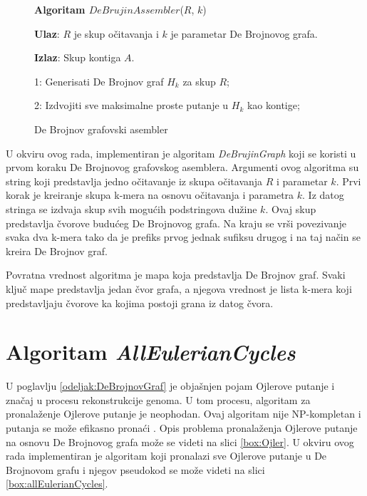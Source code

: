 \documentclass[12pt,oneside]{memoir}
\begin{document}
\begin{comment}

\begin{figure}[!ht]
\centering
\texttt{[image: Figura5\_17.PNG]}
\caption{Jednostavan De Brojnov grafovski asembler \cite{WingKinSung}}
\label{fig:11}
\end{figure}

\end{comment}

\begin{figure}[!ht]
\begin{tcolorbox}
\textbf{Algoritam $DeBrujinAssembler$}($R$, $k$)

\textbf{Ulaz}: $R$ je skup očitavanja i $k$ je parametar De Brojnovog grafa.

\textbf{Izlaz}: Skup kontiga $A$.

1: Generisati De Brojnov graf $H_k$ za skup $R$;

2: Izdvojiti sve maksimalne proste putanje u $H_k$ kao kontige;

\end{tcolorbox}
\caption{De Brojnov grafovski asembler \cite{WingKinSung}}
\label{box:DeBrujinAssembler}
\end{figure}

U okviru ovog rada, implementiran je algoritam \textit{DeBrujinGraph} koji se koristi u prvom koraku De Brojnovog grafovskog asemblera. Argumenti ovog algoritma su string koji predstavlja jedno očitavanje iz skupa očitavanja $R$ i parametar $k$. Prvi korak je kreiranje skupa k-mera na osnovu očitavanja i parametra $k$. Iz datog stringa se izdvaja skup svih mogućih podstringova dužine $k$. Ovaj skup predstavlja čvorove budućeg De Brojnovog grafa. Na kraju se vrši povezivanje svaka dva k-mera tako da je prefiks prvog jednak sufiksu drugog i na taj način se kreira De Brojnov graf.

Povratna vrednost algoritma je mapa koja predstavlja De Brojnov graf. Svaki ključ mape predstavlja jedan čvor grafa, a njegova vrednost je lista k-mera koji predstavljaju čvorove ka kojima postoji grana iz datog čvora.

\section{Algoritam \textit{AllEulerianCycles}}

U poglavlju \ref{odeljak:DeBrojnovGraf} je objašnjen pojam  Ojlerove putanje i značaj u procesu rekonstrukcije genoma. U tom procesu, algoritam za pronalaženje Ojlerove putanje je neophodan. Ovaj algoritam nije NP-kompletan i putanja se može efikasno pronaći \cite{skriptaBio}. Opis problema pronalaženja Ojlerove putanje na osnovu De Brojnovog grafa može se videti na slici \ref{box:Ojler}. U okviru ovog rada implementiran je algoritam koji pronalazi sve Ojlerove putanje u De Brojnovom grafu i njegov pseudokod se može videti na slici \ref{box:allEulerianCycles}. 
\vspace{0.2cm}
\end{document}
